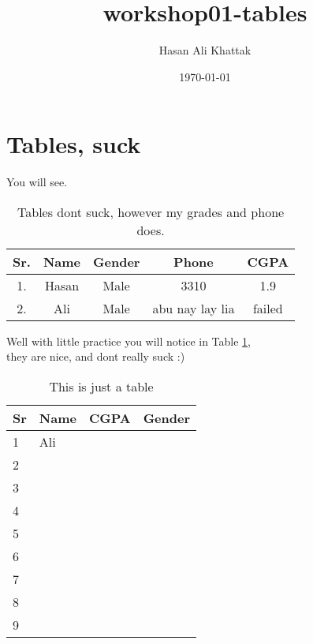 \documentclass{article}
\title{workshop01-tables}
\author{Hasan Ali Khattak}
\date{\today}
\begin{document}
\maketitle

\section{Tables, suck}
You will see.

\begin{table}[!htbp]
    \centering
    \begin{tabular}{|c|c|c|c|c|}
    \hline
     Sr. &Name &Gender &Phone & CGPA\\     \hline
     1. & Hasan & Male & 3310 & 1.9 \\ \hline
     2. & Ali & Male & abu nay lay lia& failed \\ \hline
    \end{tabular}
    \caption{Tables dont suck, however my grades and phone does.}
    \label{tab1:tableAboutMe}
\end{table}

Well with little practice you will notice in Table \ref{tab1:tableAboutMe}, \\they are nice, and dont really suck :)


\begin{table}[]
\centering
\caption{This is just a table}
\label{tab1}
\begin{tabular}{|l|l|l|l|}
\hline
Sr & Name & CGPA & Gender \\ \hline
1  & Ali  &      &        \\ \hline
2  &      &      &        \\ \hline
3  &      &      &        \\ \hline
4  &      &      &        \\ \hline
5  &      &      &        \\ \hline
6  &      &      &        \\ \hline
7  &      &      &        \\ \hline
8  &      &      &        \\ \hline
9  &      &      &        \\ \hline
\end{tabular}
\end{table}
\end{document}
